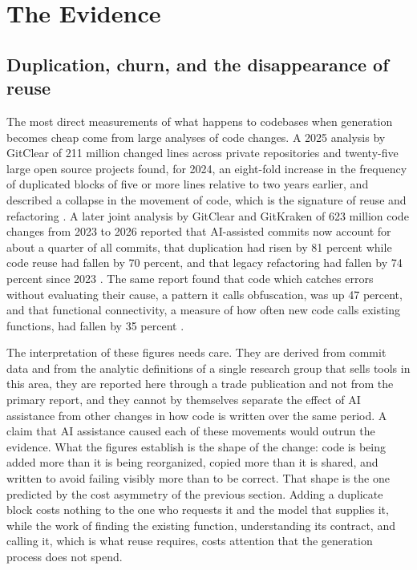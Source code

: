\documentclass[11pt,a4paper]{article}
\theoremstyle{remark}
\begin{document}
\section{The Evidence}

\subsection{Duplication, churn, and the disappearance of reuse}

The most direct measurements of what happens to codebases when generation becomes cheap come from large analyses of code changes. A 2025 analysis by GitClear of 211 million changed lines across private repositories and twenty-five large open source projects found, for 2024, an eight-fold increase in the frequency of duplicated blocks of five or more lines relative to two years earlier, and described a collapse in the movement of code, which is the signature of reuse and refactoring \cite{LeadDevDebt2025}. A later joint analysis by GitClear and GitKraken of 623 million code changes from 2023 to 2026 reported that AI-assisted commits now account for about a quarter of all commits, that duplication had risen by 81 percent while code reuse had fallen by 70 percent, and that legacy refactoring had fallen by 74 percent since 2023 \cite{LeadDev2026}. The same report found that code which catches errors without evaluating their cause, a pattern it calls obfuscation, was up 47 percent, and that functional connectivity, a measure of how often new code calls existing functions, had fallen by 35 percent \cite{LeadDev2026}.

The interpretation of these figures needs care. They are derived from commit data and from the analytic definitions of a single research group that sells tools in this area, they are reported here through a trade publication and not from the primary report, and they cannot by themselves separate the effect of AI assistance from other changes in how code is written over the same period. A claim that AI assistance caused each of these movements would outrun the evidence. What the figures establish is the shape of the change: code is being added more than it is being reorganized, copied more than it is shared, and written to avoid failing visibly more than to be correct. That shape is the one predicted by the cost asymmetry of the previous section. Adding a duplicate block costs nothing to the one who requests it and the model that supplies it, while the work of finding the existing function, understanding its contract, and calling it, which is what reuse requires, costs attention that the generation process does not spend.
\end{document}

